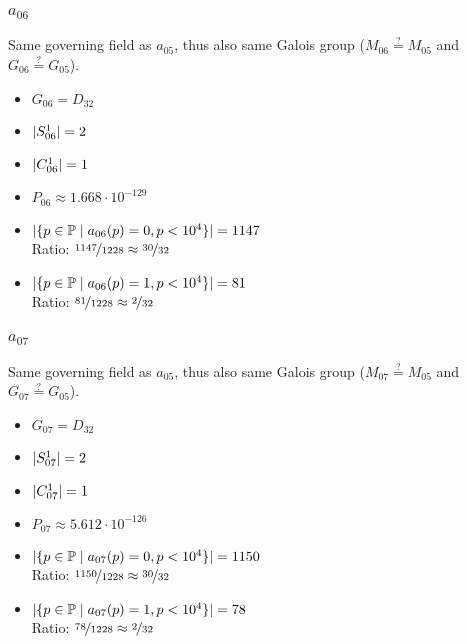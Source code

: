 \subsubsection{$a_{06}$}
Same governing field as $a_{05}$, thus also same Galois group ($M_{06} \stackrel{?}{=} M_{05}$ and $G_{06} \stackrel{?}{=} G_{05}$).
\begin{multicols}{2}
	\begin{itemize}
		\item $G_{06} = D_{32}$
		\item $| S_{06}^1 | = 2$
		\item $| C_{06}^1 | = 1$
		\item $P_{06} \approx 1.668 \cdot 10^{-129}$
	\end{itemize}
	\begin{itemize}
		\item $| \{ p \in \mathbb{P} \mid a_{06}(p)=0, p<10^4 \} | = 1147$\\
		Ratio: $\nicefrac{ 1147 }{ 1228 } \approx \nicefrac{ 30 }{ 32 }$
		\item $| \{ p \in \mathbb{P} \mid a_{06}(p)=1, p<10^4 \} | = 81$\\
		Ratio: $\nicefrac{ 81 }{ 1228 } \approx \nicefrac{ 2 }{ 32 }$
	\end{itemize}
\end{multicols}

\subsubsection{$a_{07}$}
Same governing field as $a_{05}$, thus also same Galois group ($M_{07} \stackrel{?}{=} M_{05}$ and $G_{07} \stackrel{?}{=} G_{05}$).
\begin{multicols}{2}
	\begin{itemize}
		\item $G_{07} = D_{32}$
		\item $| S_{07}^1 | = 2$
		\item $| C_{07}^1 | = 1$
		\item $P_{07} \approx 5.612 \cdot 10^{-126}$
	\end{itemize}
	\begin{itemize}
		\item $| \{ p \in \mathbb{P} \mid a_{07}(p)=0, p<10^4 \} | = 1150$\\
		Ratio: $\nicefrac{ 1150 }{ 1228 } \approx \nicefrac{ 30 }{ 32 }$
		\item $| \{ p \in \mathbb{P} \mid a_{07}(p)=1, p<10^4 \} | = 78$\\
		Ratio: $\nicefrac{ 78 }{ 1228 } \approx \nicefrac{ 2 }{ 32 }$
	\end{itemize}
\end{multicols}

